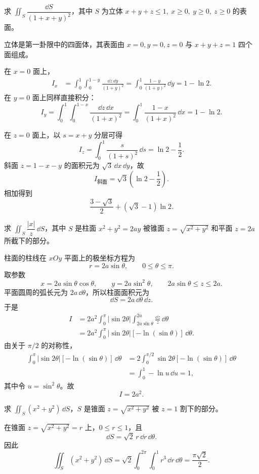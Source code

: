 \begin{xexercise}[9]
求 $\iint_S\dfrac{\dd S}{(1+x+y)^2}$，其中 $S$ 为立体 $x+y+z\le1,\ x\ge0,\ y\ge0,\ z\ge0$ 的表面。
\end{xexercise}
\begin{xsolution}
立体是第一卦限中的四面体，其表面由 $x=0,y=0,z=0$ 与 $x+y+z=1$ 四个面组成。

在 $x=0$ 面上，
\begin{align*}
I_x
&=\int_0^1\int_0^{1-y}\frac{\dd z\,\dd y}{(1+y)^2}
=\int_0^1\frac{1-y}{(1+y)^2}\,\dd y
=1-\ln2.
\end{align*}
在 $y=0$ 面上同样直接积分：
\[
I_y=\int_0^1\int_0^{1-x}\frac{\dd z\,\dd x}{(1+x)^2}
=\int_0^1\frac{1-x}{(1+x)^2}\,\dd x
=1-\ln2.
\]

在 $z=0$ 面上，以 $s=x+y$ 分层可得
\[
I_z=\int_0^1\frac{s}{(1+s)^2}\,\dd s
=\ln2-\frac12.
\]
斜面 $z=1-x-y$ 的面积元为 $\sqrt3\,\dd x\,\dd y$，故
\[
I_{\text{斜面}}=\sqrt3\left(\ln2-\frac12\right).
\]
相加得到
\[
  \boxed{\frac{3-\sqrt3}{2}+(\sqrt3-1)\ln2}.
\]
\end{xsolution}


\begin{xexercise}[10]
求 $\iint_S\dfrac{|x|}{z}\,\dd S$，其中 $S$ 是柱面 $x^2+y^2=2ay$ 被锥面 $z=\sqrt{x^2+y^2}$ 和平面 $z=2a$ 所截下的部分。
\end{xexercise}
\begin{xsolution}
柱面的柱线在 $xOy$ 平面上的极坐标方程为
\[
  r=2a\sin\theta,\qquad0\le\theta\le\pi.
\]
取参数
\[
  x=2a\sin\theta\cos\theta,\qquad
  y=2a\sin^2\theta,\qquad
  2a\sin\theta\le z\le2a.
\]
平面圆周的弧长元为 $2a\,\dd\theta$，所以柱面面积元为
\[
  \dd S=2a\,\dd\theta\,\dd z.
\]
于是
\begin{align*}
I
&=2a^2\int_0^\pi|\sin2\theta|
   \int_{2a\sin\theta}^{2a}\frac{\dd z}{z}\,\dd\theta\\
&=2a^2\int_0^\pi|\sin2\theta|[-\ln(\sin\theta)]\,\dd\theta.
\end{align*}
由关于 $\pi/2$ 的对称性，
\begin{align*}
\int_0^\pi|\sin2\theta|[-\ln(\sin\theta)]\,\dd\theta
&=2\int_0^{\pi/2}\sin2\theta[-\ln(\sin\theta)]\,\dd\theta\\
&=\int_0^1-\ln u\,\dd u=1,
\end{align*}
其中令 $u=\sin^2\theta$。故
\[
  \boxed{I=2a^2}.
\]
\end{xsolution}


\begin{xexercise}[11]
求 $\iint_S(x^2+y^2)\,\dd S$，$S$ 是锥面 $z=\sqrt{x^2+y^2}$ 被 $z=1$ 割下的部分。
\end{xexercise}
\begin{xsolution}
在锥面 $z=\sqrt{x^2+y^2}=r$ 上，$0\le r\le1$，且
\[
  \dd S=\sqrt2\,r\,\dd r\,\dd\theta.
\]
因此
\[
  \iint_S(x^2+y^2)\,\dd S
  =\sqrt2\int_0^{2\pi}\int_0^1r^3\,\dd r\,\dd\theta
  =\frac{\pi\sqrt2}{2}.
\]
\end{xsolution}


